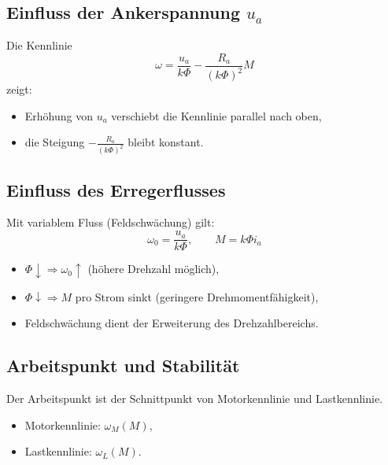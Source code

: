 \subsection{Einfluss der Ankerspannung $u_a$}

Die Kennlinie
\[
\omega=\frac{u_a}{k\Phi}-\frac{R_a}{(k\Phi)^2}M
\]
zeigt:

\begin{itemize}
    \item Erhöhung von $u_a$ verschiebt die Kennlinie parallel nach oben,
    \item die Steigung $-\frac{R_a}{(k\Phi)^2}$ bleibt konstant.
\end{itemize}


\subsection{Einfluss des Erregerflusses}

Mit variablem Fluss (Feldschwächung) gilt:
\[
\omega_0=\frac{u_a}{k\Phi},
\qquad
M=k\Phi i_a
\]

\begin{itemize}
    \item $\Phi\downarrow \Rightarrow \omega_0\uparrow$ (höhere Drehzahl möglich),
    \item $\Phi\downarrow \Rightarrow M$ pro Strom sinkt (geringere Drehmomentfähigkeit),
    \item Feldschwächung dient der Erweiterung des Drehzahlbereichs.
\end{itemize}

\subsection{Arbeitspunkt und Stabilität}

Der Arbeitspunkt ist der Schnittpunkt von Motorkennlinie und Lastkennlinie.

\begin{itemize}
    \item Motorkennlinie: $\omega_M(M)$,
    \item Lastkennlinie: $\omega_L(M)$.
\end{itemize}

